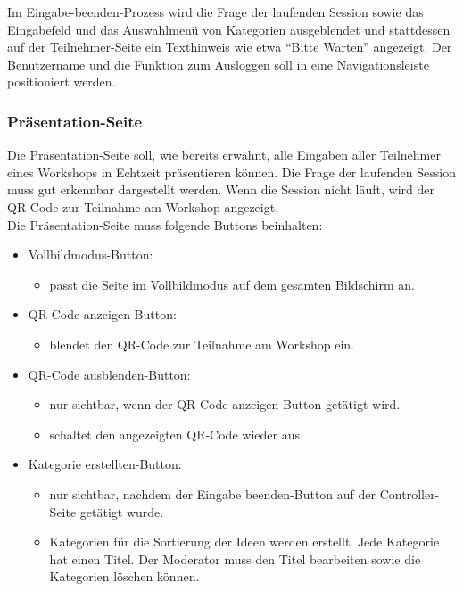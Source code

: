 Im Eingabe-beenden-Prozess wird die Frage der laufenden Session sowie das Eingabefeld und das Auswahlmenü von Kategorien ausgeblendet und stattdessen auf der Teilnehmer-Seite ein Texthinweis wie etwa “Bitte Warten” angezeigt. Der Benutzername und die Funktion zum Ausloggen soll in eine Navigationsleiste positioniert werden.

\subsubsection*{Präsentation-Seite}
Die Präsentation-Seite soll, wie bereits erwähnt, alle Eingaben aller Teilnehmer eines Workshops in Echtzeit präsentieren können. Die Frage der laufenden Session muss gut erkennbar dargestellt werden. Wenn die Session nicht läuft, wird der QR-Code zur Teilnahme am Workshop angezeigt.\\

Die Präsentation-Seite muss folgende Buttons beinhalten:
\begin{itemize}
\item Vollbildmodus-Button:
\begin{itemize}
\item passt die Seite im Vollbildmodus auf dem gesamten Bildschirm an.
\end{itemize}
\item QR-Code anzeigen-Button:
\begin{itemize}
\item blendet den QR-Code zur Teilnahme am Workshop ein.
\end{itemize}
\item QR-Code ausblenden-Button:
\begin{itemize}
\item nur sichtbar, wenn der QR-Code anzeigen-Button getätigt wird.
\item schaltet den angezeigten QR-Code wieder aus.
\end{itemize}
\item Kategorie erstellten-Button:
\begin{itemize}
\item nur sichtbar, nachdem der Eingabe beenden-Button auf der Controller-Seite getätigt wurde.
\item Kategorien für die Sortierung der Ideen werden erstellt. Jede Kategorie hat einen Titel. Der Moderator muss den Titel bearbeiten sowie die Kategorien löschen können.
\end{itemize}
\end{itemize}

